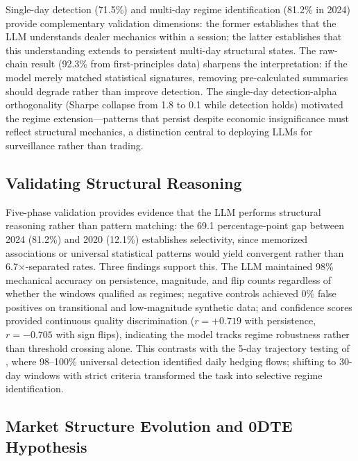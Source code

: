 \documentclass[jrfm,article,accept,moreauthors,pdftex]{Definitions/mdpi}
\begin{document}
Single-day detection (71.5\%) and multi-day regime identification (81.2\% in 2024) provide complementary validation dimensions: the former establishes that the LLM understands dealer mechanics within a session; the latter establishes that this understanding extends to persistent multi-day structural states. The raw-chain result (92.3\% from first-principles data) sharpens the interpretation: if the model merely matched statistical signatures, removing pre-calculated summaries should degrade rather than improve detection. The single-day detection-alpha orthogonality (Sharpe collapse from 1.8 to 0.1 while detection holds) motivated the regime extension---patterns that persist despite economic insignificance must reflect structural mechanics, a distinction central to deploying LLMs for surveillance rather than trading.

\subsection{Validating Structural Reasoning}

Five-phase validation provides evidence that the LLM performs structural reasoning rather than pattern matching: the 69.1 percentage-point gap between 2024 (81.2\%) and 2020 (12.1\%) establishes selectivity, since memorized associations or universal statistical patterns would yield convergent rather than 6.7$\times$-separated rates. Three findings support this. The LLM maintained 98\% mechanical accuracy on persistence, magnitude, and flip counts regardless of whether the windows qualified as regimes; negative controls achieved 0\% false positives on transitional and low-magnitude synthetic data; and confidence scores provided continuous quality discrimination ($r = +0.719$ with persistence, $r = -0.705$ with sign flips), indicating the model tracks regime robustness rather than threshold crossing alone. This contrasts with the 5-day trajectory testing of \citet{regan2025obfuscation}, where 98--100\% universal detection identified daily hedging flows; shifting to 30-day windows with strict criteria transformed the task into selective regime identification.

\subsection{Market Structure Evolution and 0DTE Hypothesis}
\label{sec:discussion:0dte}
\end{document}
